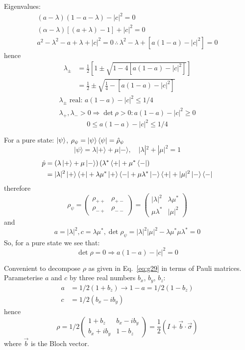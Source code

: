 \documentclass[12pt]{article}
\newcommand{\be}{\begin{equation}}
\newcommand{\ee}{\end{equation}}
\begin{document}
Eigenvalues:
\[
\begin{gathered}
(a-\lambda)(1-a-\lambda)-|c|^{2}=0\\
(\alpha-\lambda)[(a+\lambda)-1]+|c|^{2}=0\\
a^{2}-\lambda^{2}-a+\lambda+|c|^{2}=0 \,\therefore\,
\lambda^{2}-\lambda+\left[a(1-a)-|c|^{2}\right]=0
\end{gathered}
\]
hence
\be
\begin{aligned}
\lambda_{\pm}
&=\frac{1}{2}\left[1 \pm \sqrt{1-4\left[a(1-a)-|c|^{2}\right]}\right]\\
&=\frac{1}{2} \pm \sqrt{\frac{1}{4}-\left[a(1-a)-|c|^{2}\right]}
\end{aligned}
\ee
\[
\begin{gathered}
\lambda_\pm \text{ real: }a(1-a)-|c|^{2} \leqslant 1 / 4\\
\lambda_+,\lambda_->0 \Rightarrow \det \rho>0: a(1-a)-|c|^{2} \geqslant 0
\end{gathered}
\]
\be
\boxed{
0 \leqslant a(1-a)-|c|^{2} \leqslant 1 / 4
}
\label{eq:g32}
\ee

For a pure state: $\ket{\psi}$, $\rho_\psi = \ket{\psi}\bra{\psi} = \hat{\rho}_\psi$
\be
|\psi\rangle=\lambda|+\rangle+\mu|-\rangle, \quad|\lambda|^{2}+|\mu|^{2}=1
\ee
\be
\begin{aligned}
\hat{p}
&=\left(\lambda\ket{+}+\mu\ket{-}\right)
  \left(\lambda^{*}\bra{+}+\mu^{*}\bra{-}\right)\\
&=|\lambda|^2\ket{+}\bra{+}+
 \lambda\mu^*\ket{+}\bra{-}+
 \mu\lambda^*\ket{-}\bra{+}+
|\mu|^2      \ket{-}\bra{-}
\end{aligned}
\ee
therefore
\be
\rho_\psi = 
\begin{pmatrix}
\rho_{++} & \rho_{+-} \\ 
\rho_{-+} & \rho_{--}
\end{pmatrix}
=
\begin{pmatrix}
|\lambda|^2 & \lambda\mu^*\\
\mu\lambda^* & |\mu|^2 
\end{pmatrix}
\ee
and
\[
a=|\lambda|^{2}, c=\lambda \mu^{*}, \det \rho_{\psi}=|\lambda|^{2}|\mu|^{2}-\lambda \mu^{*} \mu \lambda^{*}=0
\]
So, for a pure state we see that:
\be
\boxed{\det \rho = 0} \Rightarrow a(1-a) - |c|^2 = 0 
\ee

Convenient to decompose $\rho$ as given in Eq.~\eqref{eq:g29} in
terms of Pauli matrices.
Parameterise $a$ and $c$ by three real numbers $b_x$, $b_y$, $b_z$:
\setcounter{equation}{35}
\be
\begin{aligned}
a&=1 / 2\left(1+b_{z}\right) \rightarrow 1-a=1 / 2\left(1-b_{z}\right) \\ 
c&=1 / 2\left(b_{x}-i b_{y}\right)
\end{aligned}
\ee
hence
\be
\rho=1 / 2
\begin{pmatrix}
1+b_{z} & b_{x}-i b_y \\ 
b_{x}+i b_y & 1-b_{z}
\end{pmatrix}
= \frac{1}{2} (I + \vec{b}\cdot\vec{\sigma})
\ee
where $\vec{b}$ is the Bloch vector.
\end{document}

